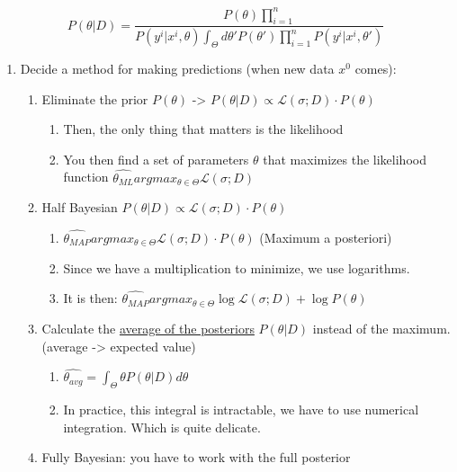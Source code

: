 \[
	P(\theta | D) = \frac{P(\theta) \prod_{i=1}^n}{P(y^i|x^i, \theta)
		{\int_\Theta d\theta' P(\theta')\prod_{i=1}^n} P(y^i|x^i, \theta')}
\]

\begin{enumerate}
	\item
	      Decide a method for making predictions (when new data \(x^0\) comes):

	      \begin{enumerate}
		      \item
		            Eliminate the prior \(P(\theta)\) -\textgreater{}
		            \(P(\theta | D) \propto \mathcal{L}(\sigma ; D) \cdot P(\theta)\)

		            \begin{enumerate}
			            \item
			                  Then, the only thing that matters is the likelihood
			            \item
			                  You then find a set of parameters \(\theta\) that maximizes the
			                  likelihood function
			                  \(\hat{\theta_{ML}} argmax_{\theta \in \Theta} \mathcal{L}(\sigma ; D)\)
		            \end{enumerate}
		      \item
		            Half Bayesian
		            \(P(\theta | D) \propto \mathcal{L}(\sigma ; D) \cdot P(\theta)\)

		            \begin{enumerate}
			            \item
			                  \(\hat{\theta_{MAP}} argmax_{\theta \in \Theta} \mathcal{L}(\sigma ; D) \cdot P(\theta)\)
			                  (Maximum a posteriori)
			            \item
			                  Since we have a multiplication to minimize, we use logarithms.
			            \item
			                  It is then:
			                  \(\hat{\theta_{MAP}} argmax_{\theta \in \Theta} \log \mathcal{L}(\sigma ; D) + \log P(\theta)\)
		            \end{enumerate}
		      \item
		            Calculate the \uline{average of the posteriors} \(P(\theta | D)\)
		            instead of the maximum. (average -\textgreater{} expected value)

		            \begin{enumerate}
			            \item
			                  \(\hat{\theta_{avg}} = \int_\Theta \theta P(\theta | D) d\theta\)
			            \item
			                  In practice, this integral is intractable, we have to use
			                  numerical integration. Which is quite delicate.
		            \end{enumerate}
		      \item
		            Fully Bayesian: you have to work with the full posterior


\end{enumerate}
\end{enumerate}

